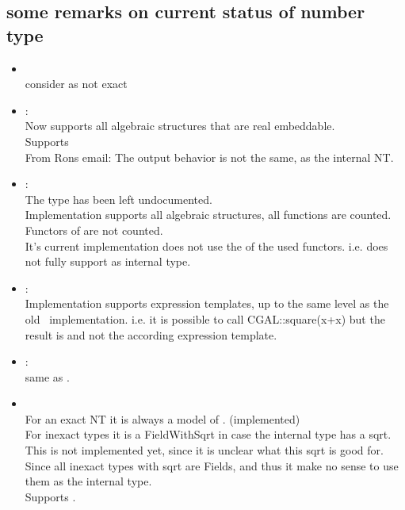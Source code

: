 \subsection{some remarks on current status of number type}
\begin{itemize}
\item  {}\\
       consider  as not exact
\item {}:\\
      Now supports all algebraic structures that are real embeddable.\\
      Supports \\ 
      From Rons email: The output behavior is not the same, as the internal NT. 

\item {}:\\
        The type has been left undocumented.\\
        Implementation supports all algebraic structures, all functions are counted.\\
        Functors of  are not counted. \\
        It's current implementation does not use the  of the used 
        functors. i.e. does not fully support  as internal type.

\item {}:\\
       Implementation supports expression templates, 
       up to the same level as the old \cgal\ implementation.       
       i.e. it is possible to call CGAL::square(x+x) but the result is 
        and not the according expression template.  

\item {}:\\
        same as .

\item {}\\
        For an exact NT it is always a model of . (implemented)\\
        For inexact types it is a FieldWithSqrt in case the internal type has a sqrt.
        This is not implemented yet, since it is unclear what this sqrt is good for. 
        Since all inexact types with sqrt are Fields, and thus it make no sense to use 
        them as the internal type.  \\
        Supports . 
\end{itemize}
